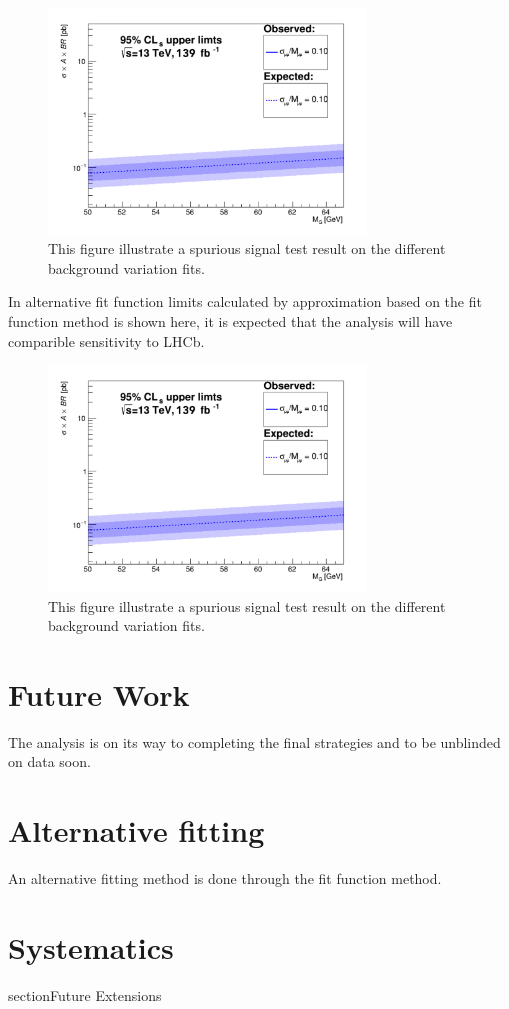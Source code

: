 \begin{figure}[!htb]
   \begin{center}
       \includegraphics[width=0.75\textwidth]{figures/chapter_dimuon/limits}       
       \caption{
       This figure illustrate a spurious signal test result on the different background variation fits.
       }
    \label{fig:dimuonstudies}
   \end{center}
\end{figure}

In alternative fit function limits calculated by approximation based on the fit function method is shown here, it is expected that the analysis will have comparible sensitivity to LHCb. 

\begin{figure}[!htb]
   \begin{center}
       \includegraphics[width=0.75\textwidth]{figures/chapter_dimuon/limits}
       \caption{
       This figure illustrate a spurious signal test result on the different background variation fits.}
            \label{fig:dimuonstudies}
   \end{center}
\end{figure}



\section{Future Work}
The analysis is on its way to completing the final strategies and to be unblinded on data soon.

\section{Alternative fitting}
An alternative fitting method is done through the fit function method.

\section{Systematics}
section{Future Extensions}


